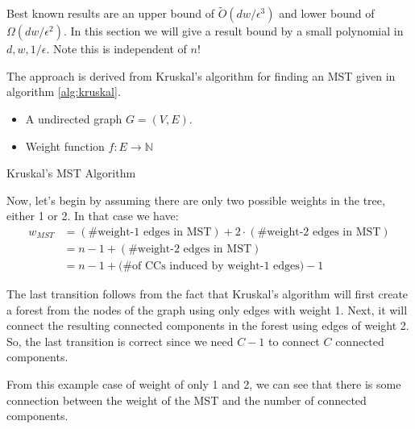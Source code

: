 Best known results are an upper bound of $\tilde{O}(dw/\epsilon^{3})$ and lower bound of $\Omega(dw/\epsilon^{2})$.
In this section we will give a result bound by a small polynomial in $d,w,1/\epsilon$.
Note this is independent of $n$!

The approach is derived from Kruskal's algorithm for finding an MST given in algorithm \ref{alg:kruskal}.
\begin{algorithm}[t]\label{alg:kruskal}

\Input{}
   \begin{itemize}  
   \item A undirected graph $G=(V,E)$. 
   \item Weight function $f:E \rightarrow \mathbb{N}$ 
   \end{itemize}
\caption{Kruskal's MST Algorithm}
\end{algorithm}
Now, let's begin by assuming there are only two possible weights in the tree, either 1 or 2. In that case we have:
\[
    \begin{aligned}
w_{MST} &= (\text{\# weight-1 edges in MST}) + 2 \cdot (\text{\# weight-2 edges in MST}) \\ 
&= n-1 + (\text{\# weight-2 edges in MST}) \\
&= n-1 + (\text{\# of CCs induced by weight-1 edges)} -1
\end{aligned}
\]

The last transition follows from the fact that Kruskal's algorithm will first create a forest from the nodes of the graph using only edges with weight 1.
Next, it will connect the resulting connected components in the forest using edges of weight 2.
So, the last transition is correct since we need $C-1$ to connect $C$ connected components.

From this example case of weight of only 1 and 2, we can see that there is some connection between the weight of the MST and the number of connected components.

